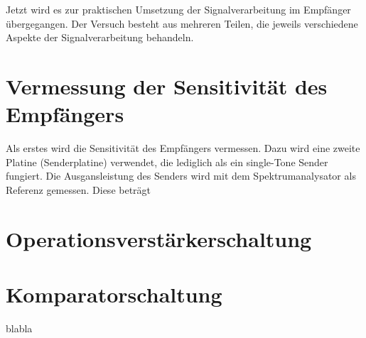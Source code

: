 Jetzt wird es zur praktischen Umsetzung der Signalverarbeitung im Empfänger übergegangen. Der Versuch besteht aus mehreren Teilen, die jeweils verschiedene Aspekte der Signalverarbeitung behandeln.
\section{Vermessung der Sensitivität des Empfängers} %
Als erstes wird die Sensitivität des Empfängers vermessen. Dazu wird eine zweite Platine (Senderplatine) verwendet, die lediglich als ein single-Tone Sender fungiert. Die Ausgansleistung des Senders wird mit dem Spektrumanalysator als Referenz gemessen. Diese beträgt 
\section{Operationsverstärkerschaltung} %

\section{Komparatorschaltung} %
blabla
\clearpage